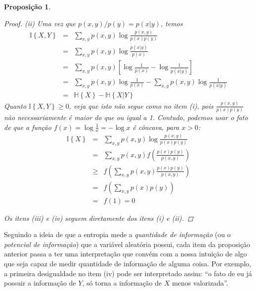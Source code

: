 \documentclass{amsart}
\theoremstyle{theorem}
\newtheorem{proposicao}{Proposi\c{c}\~{a}o}[section]
\theoremstyle{definition}
\theoremstyle{remark}
\numberwithin{equation}{section}
\newcommand{\HH}[1]{\mathbb{H}\left\{ #1 \right\}}
\newcommand{\II}[1]{\mathbb{I}\left\{ #1 \right\}}
\begin{document}
\begin{proposicao}
\begin{proof}
    (ii) Uma vez que $p(x,y)/p(y) = p(x|y)$, temos
    \begin{equation*}
    \begin{array}{rcl}
      \II{X,Y} & = & \displaystyle \sum_{x,y} p(x,y) \log \frac{p(x,y)}{p(x)p(y)} \\
        & = & \displaystyle \sum_{x,y} p(x,y) \log \frac{p(x|y)}{p(x)} \\
        & = & \displaystyle \sum_{x,y} p(x,y) \left[\log \frac{1}{p(x)} - \log \frac{1}{p(x|y)}\right] \\
        & = & \displaystyle \sum_{x,y} p(x,y) \log \frac{1}{p(x)} - \sum_{x,y} p(x,y) \log \frac{1}{p(x|y)} \\
        & = & \HH{X} - \HH{X|Y}
    \end{array}
    \end{equation*}
    Quanto $\II{X,Y} \geq 0$, veja que isto n\~{a}o segue como no item (i), pois $\frac{p(x,y)}{p(x)p(y)}$ n\~{a}o necessariamente \'{e} maior do que ou igual a 1. Contudo, podemos usar o fato de que a fun\c{c}\~{a}o $f(x) = \log{\frac{1}{x}} = - \log{x}$ \'{e} c\^{o}ncava, para $x>0$:
    \begin{equation*}
    \begin{array}{rcl}
      \II{X} &=& \displaystyle \sum_{x,y} p(x,y) \log \frac{p(x,y)}{p(x)p(y)} \\
        &=& \displaystyle \sum_{x,y} p(x,y) f\left(\frac{p(x)p(y)}{p(x,y)}\right) \\
        &\geq& \displaystyle f\left( \sum_{x,y} p(x,y) \frac{p(x)p(y)}{p(x,y)}\right) \\
        &=& \displaystyle f\left(\sum_{x,y} p(x)p(y)\right) \\
        &=& f(1) = 0
    \end{array}
    \end{equation*}

    Os itens (iii) e (iv) seguem diretamente dos itens (i) e (ii).
  \end{proof}
\end{proposicao}

Seguindo a ideia de que a entropia mede a \emph{quantidade de informa\c{c}\~{a}o} (ou o \emph{potencial de informa\c{c}\~{a}o}) que a vari\'{a}vel aleat\'{o}ria possui, cada item da proposi\c{c}\~{a}o anterior passa a ter uma interpreta\c{c}\~{a}o que conv\'{e}m com a nossa intui\c{c}\~{a}o de algo que seja capaz de medir quantidade de informa\c{c}\~{a}o de alguma coisa. Por exemplo, a primeira desigualdade no item (iv) pode ser interpretado assim: ``o fato de eu j\'{a} possuir a informa\c{c}\~{a}o de $Y$, s\'{o} torna a informa\c{c}\~{a}o de $X$ menos valorizada''.
\end{document}
